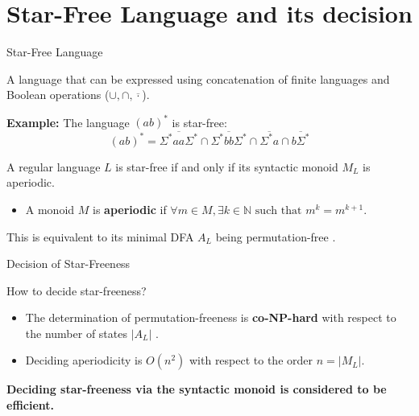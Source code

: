 \documentclass{beamer}
\begin{document}
\section{Star-Free Language and its decision}
\begin{frame}{Star-Free Language}

\begin{definition}
{\small A language that can be expressed using concatenation of finite languages and Boolean operations ($\cup, \cap, \overline{\cdot}$).}
\end{definition}

\textbf{Example:} The language $(ab)^*$ is star-free:
$$ (ab)^* = \overline{\Sigma^*aa\Sigma^*} \cap \overline{\Sigma^*bb\Sigma^*} \cap \overline{\Sigma^*a} \cap \overline{b\Sigma^*} $$

\begin{theorem}[Schützenberger, 1965]
A regular language $L$ is star-free if and only if its syntactic monoid $M_L$ is aperiodic\cite{schutzenger65}. 
\begin{itemize}
    \item A monoid $M$ is \textbf{aperiodic} if $\forall m \in M, \exists k \in \mathbb{N} \text{ such that } m^k = m^{k+1}$.
\end{itemize}
\end{theorem}
{\small This is equivalent to its minimal DFA $A_L$ being permutation-free .}
\end{frame}

\begin{frame}{Decision of Star-Freeness}
\begin{alertblock}{How to decide star-freeness?}
\begin{itemize}
    \item The determination of permutation-freeness is \textbf{ co-NP-hard} with respect to the number of states $|A_L|$ \cite{stern85}.
    \item Deciding aperiodicity is $O(n^2)$ with respect to the order $n = |M_L|$.
\end{itemize}
\end{alertblock}
\textbf{Deciding star-freeness via the syntactic monoid is considered to be efficient.}
\end{frame}

\end{document}
